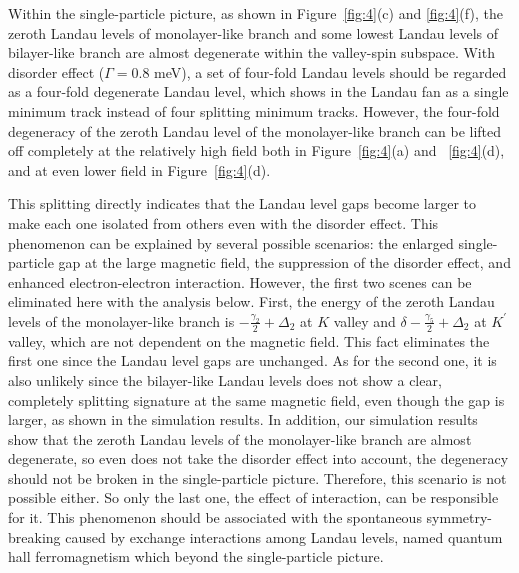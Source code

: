 Within the single-particle picture, as shown in Figure~\ref{fig:4}(c) and \ref{fig:4}(f), the zeroth Landau levels of monolayer-like branch and some lowest Landau levels of bilayer-like branch are almost degenerate within the valley-spin subspace. 
With disorder effect ($\Gamma = 0.8$ meV), a set of four-fold Landau levels should be regarded as a four-fold degenerate Landau level, 
which shows in the Landau fan as a single minimum track instead of four splitting minimum tracks. 
However, the four-fold degeneracy of the zeroth Landau level of the monolayer-like branch can be lifted off completely at the relatively high field both in Figure~\ref{fig:4}(a) and ~\ref{fig:4}(d), 
and at even lower field in Figure~\ref{fig:4}(d). 

This splitting directly indicates that the Landau level gaps become larger to make each one isolated from others even with the disorder effect. 
This phenomenon can be explained by several possible scenarios: the enlarged single-particle gap at the large magnetic field, the suppression of the disorder effect, and enhanced electron-electron interaction. 
However, the first two scenes can be eliminated here with the analysis below. 
First,  the energy of the zeroth Landau levels of the monolayer-like branch is $- \frac{\gamma_2}{2} + \Delta_2$ at $K$ valley and $\delta - \frac{\gamma_5}{2} + \Delta_2$ at $K^{\prime}$ valley, which are not dependent on the magnetic field. 
This fact eliminates the first one since the Landau level gaps are unchanged. 
As for the second one, it is also unlikely since the bilayer-like Landau levels does not show a clear, completely splitting signature at the same magnetic field, 
even though the gap is larger, as shown in the simulation results. 
In addition, our simulation results show that the zeroth Landau levels of the monolayer-like branch are almost degenerate, so even does not take the disorder effect into account, 
the degeneracy should not be broken in the single-particle picture. 
Therefore, this scenario is not possible either. So only the last one, the effect of interaction, can be responsible for it. 
This phenomenon should be associated with the spontaneous symmetry-breaking caused by exchange interactions among Landau levels, 
named quantum hall ferromagnetism which beyond the single-particle picture\cite{zhang2012hund, lee2013broken, stepanov2016tunable, datta2017strong, young2012spin, liu2022visualizing, coissard2022imaging, lee2014chemical}. 

